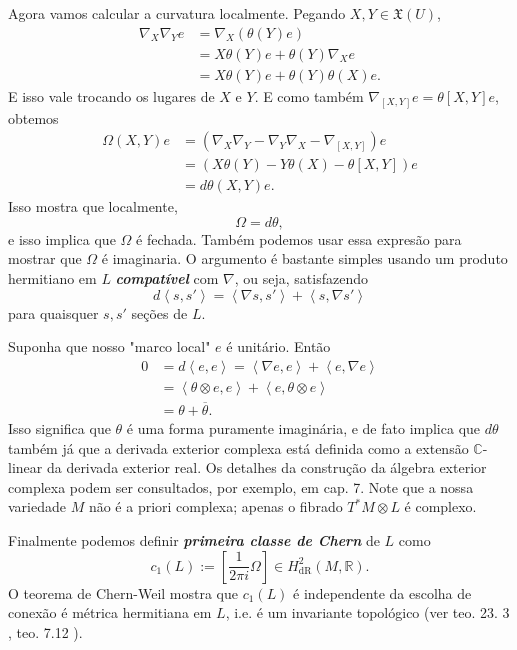 Agora vamos calcular a curvatura localmente. Pegando $X,Y \in \mathfrak{X}(U)$,
\begin{align*}
\nabla_X\nabla_Y e&=\nabla_X(\theta(Y) e)\\
&=X\theta(Y) e+\theta(Y)\nabla_Xe\\
&=X\theta(Y) e+\theta(Y)\theta(X)e.
\end{align*}
E isso vale trocando os lugares de $X$ e $Y$. E como também $\nabla_{[X,Y]}e=\theta[X,Y]e$, obtemos
\begin{align*}
\Omega(X,Y)e&=(\nabla_X\nabla_Y-\nabla_Y\nabla_X-\nabla_{[X,Y]})e\\
&=(X\theta(Y)-Y\theta(X)-\theta[X,Y])e\\
&=d\theta(X,Y)e.
\end{align*}
Isso mostra que localmente,
\[\Omega=d\theta,\]
e isso implica que $\Omega$ é fechada. Também podemos usar essa expresão para mostrar que $\Omega$ é imaginaria. O argumento é bastante simples usando um produto hermitiano em $L$ \textit{\textbf{compatível}} com $\nabla$, ou seja, satisfazendo
\[d\left<s,s'\right>=\left<\nabla s,s'\right>+\left<s,\nabla s'\right>\]
para quaisquer $s,s'$  seções de $L$.

 Suponha que nosso "marco local" $e$ é unitário. Então
\begin{align*}
0&=d\left<e,e\right>=\left<\nabla e,e\right>+\left<e,\nabla e\right>\\
&=\left<\theta \otimes e,e\right>+\left<e, \theta \otimes e\right>\\
&=\theta + \overline{\theta}.
\end{align*}
Isso significa que $\theta$ é uma forma puramente imaginária, e de fato implica que $d\theta$ também já que a derivada exterior complexa está definida como a extensão $\mathbb{C}$-linear da derivada exterior real. Os detalhes da construção da álgebra exterior complexa podem ser consultados, por exemplo, em \cite{leec} cap. 7. Note que a nossa variedade $M$ não é a priori complexa; apenas o fibrado $T^*M \otimes L$ é complexo.

Finalmente podemos definir \textit{\textbf{primeira classe de Chern}} de $L$ como
\[c_1(L):=\left[ \frac{1}{2\pi i}\Omega \right] \in H^{2}_{\operatorname{dR}}(M,\mathbb{R}).\]
O teorema de Chern-Weil mostra que $c_1(L)$ é independente da escolha de conexão é métrica hermitiana em $L$, i.e. é um invariante topológico (ver teo. 23. 3 \cite{tu-diff}, teo. 7.12 \cite{leec}).

